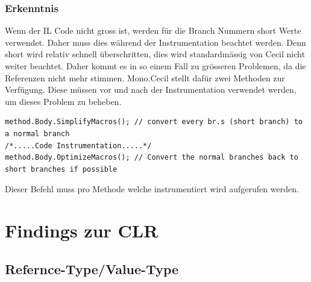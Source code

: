 \documentclass[10pt,a4paper]{article}
\begin{document}
\subsubsection{Erkenntnis}
\begin{flushleft}
Wenn der IL Code nicht gross ist, werden für die Branch Nummern short Werte verwendet.
Daher muss dies während der Instrumentation beachtet werden. Denn short wird relativ schnell überschritten, dies wird standardmässig von Cecil nicht weiter beachtet. Daher kommt es in so einem Fall zu grösseren Problemen, da die Referenzen nicht mehr stimmen.
Mono.Cecil stellt dafür zwei Methoden zur Verfügung. Diese müssen vor und nach der Instrumentation verwendet werden, um dieses Problem zu beheben.
\begin{lstlisting} 
method.Body.SimplifyMacros(); // convert every br.s (short branch) to a normal branch
/*.....Code Instrumentation.....*/
method.Body.OptimizeMacros(); // Convert the normal branches back to short branches if possible
\end{lstlisting}
Dieser Befehl muss pro Methode welche instrumentiert wird aufgerufen werden.
\end{flushleft}
\newpage
\section{Findings zur CLR}
\subsection{Refernce-Type/Value-Type}
\end{document}
